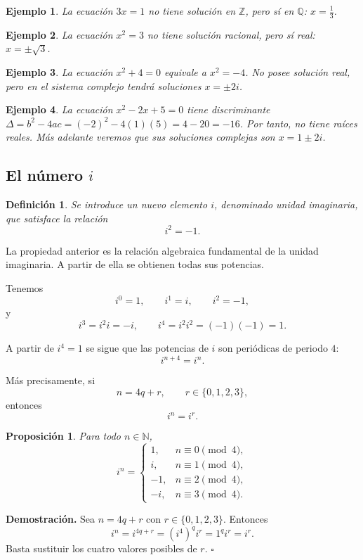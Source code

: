 \documentclass[12pt]{article}
\newtheorem{Ejem}{Ejemplo}
\newtheorem{Prop}{Proposici\'on}
\newtheorem{Def}{Definici\'on}
\begin{document}
\begin{Ejem}
La ecuación $3x=1$ no tiene solución en $\mathbb{Z}$, pero sí en $\mathbb{Q}$: $x=\frac13$.
\end{Ejem}


\begin{Ejem}
La ecuación $x^2=3$ no tiene solución racional, pero sí real: $x=\pm\sqrt3$.
\end{Ejem}

\begin{Ejem}
La ecuación $x^2+4=0$ equivale a $x^2=-4$. No posee solución real, pero en el sistema complejo tendrá soluciones $x=\pm 2i$.
\end{Ejem}

\begin{Ejem}
La ecuación $x^2-2x+5=0$ tiene discriminante  $\Delta=b^2-4ac=(-2)^2-4(1)(5)=4-20=-16$. Por tanto, no tiene raíces reales. Más adelante veremos que sus soluciones complejas son $x=1\pm 2i$.
\end{Ejem}


\subsection*{El n\'umero $i$}

\begin{Def}
Se introduce un nuevo elemento $i$, denominado \emph{unidad imaginaria}, que satisface la relación
\[
\boxed{i^2=-1.}
\]
\end{Def}
La propiedad anterior es la relación algebraica fundamental de la unidad
imaginaria. A partir de ella se obtienen todas sus potencias.

Tenemos
\[
i^0=1,
\qquad
i^1=i,
\qquad
i^2=-1,
\]
y
\[
i^3=i^2i=-i,
\qquad
i^4=i^2i^2=(-1)(-1)=1.
\]

A partir de $i^4=1$ se sigue que las potencias de $i$ son periódicas de
periodo $4$:
\[
\boxed{i^{n+4}=i^n.}
\]

Más precisamente, si
\[
n=4q+r,
\qquad r\in\{0,1,2,3\},
\]
entonces
\[
i^n=i^r.
\]

\begin{Prop}
Para todo $n\in\mathbb{N}$,
\[
i^n=
\begin{cases}
1, & n\equiv 0 \pmod 4,\\
i, & n\equiv 1 \pmod 4,\\
-1, & n\equiv 2 \pmod 4,\\
-i, & n\equiv 3 \pmod 4.
\end{cases}
\]
\end{Prop}
\textbf{Demostración.}
Sea $n=4q+r$ con $r\in\{0,1,2,3\}$. Entonces
\[
i^n=i^{4q+r}=(i^4)^qi^r=1^qi^r=i^r.
\]
Basta sustituir los cuatro valores posibles de $r$.
\hfill$\square$
\end{document}

